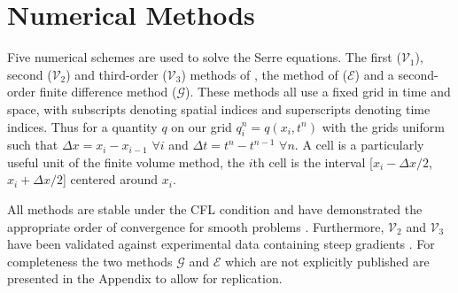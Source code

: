 \documentclass[times]{elsarticle}
\begin{document}
\section{Numerical Methods}
\label{sec:nummeth}
Five numerical schemes are used to solve the Serre equations. The first ($\mathcal{V}_1$), second ($\mathcal{V}_2$) and third-order ($\mathcal{V}_3$) methods of \cite{Zoppou-etal-2017}, the method of \citet{El-etal-2006} ($\mathcal{E}$) and a second-order finite difference method ($\mathcal{G}$). These methods all use a fixed grid in time and space, with subscripts denoting spatial indices and superscripts denoting time indices. Thus for a quantity $q$ on our grid $q_i^n = q(x_i,t^n)$ with the grids uniform such that $\Delta x = x_{i} - x_{i-1}$ $\forall i$ and $\Delta t = t^{n} - t^{n-1}$ $\forall n$. A cell is a particularly useful unit of the finite volume method, the $i$th cell is the interval [$x_i -\Delta x/2$,$x_i +\Delta x/2$] centered around $x_{i}$.

All methods are stable under the CFL condition \cite{Harten-etal-1983-357} and have demonstrated the appropriate order of convergence for smooth problems \cite{Zoppou-etal-2017}. Furthermore, $\mathcal{V}_2$ and $\mathcal{V}_3$ have been validated against experimental data containing steep gradients \cite{Zoppou-etal-2017}. For completeness the two methods $\mathcal{G}$ and $\mathcal{E}$ which are not explicitly published are presented in the Appendix to allow for replication.

\end{document}
